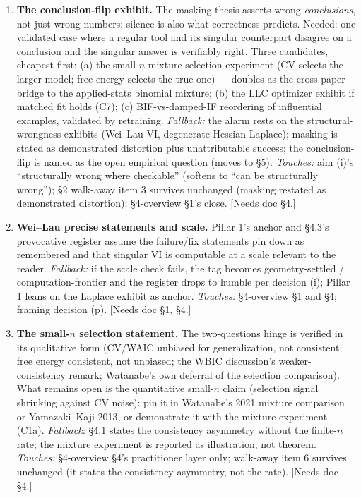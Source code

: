 \documentclass[11pt]{article}
\begin{document}
\begin{enumerate}[label=\textbf{C\arabic*.}, leftmargin=*, itemsep=6pt]

\item \textbf{The conclusion-flip exhibit.} The masking thesis asserts
wrong \emph{conclusions}, not just wrong numbers; silence is also what
correctness predicts. Needed: one validated case where a regular tool
and its singular counterpart disagree on a conclusion and the singular
answer is verifiably right. Three candidates, cheapest first: (a) the
small-$n$ mixture selection experiment (CV selects the larger model;
free energy selects the true one) --- doubles as the cross-paper bridge
to the applied-stats binomial mixture; (b) the LLC optimizer exhibit if
matched fit holds (C7); (c) BIF-vs-damped-IF reordering of influential
examples, validated by retraining. \emph{Fallback:} the alarm rests on
the structural-wrongness exhibits (Wei--Lau VI, degenerate-Hessian
Laplace); masking is stated as demonstrated distortion plus
unattributable success; the conclusion-flip is named as the open
empirical question (moves to \S5). \emph{Touches:} aim (i)'s
``structurally wrong where checkable'' (softens to ``can be
structurally wrong''); \S2 walk-away item 3 survives unchanged (masking
restated as demonstrated distortion); \S4-overview \S1's close. [Needs
doc \S4.]

\item \textbf{Wei--Lau precise statements and scale.} Pillar 1's anchor
and \S4.3's provocative register assume the failure/fix statements pin
down as remembered and that singular VI is computable at a scale
relevant to the reader. \emph{Fallback:} if the scale check fails, the
tag becomes geometry-settled / computation-frontier and the register
drops to humble per decision (i); Pillar 1 leans on the Laplace exhibit
as anchor. \emph{Touches:} \S4-overview \S1 and \S4; framing decision
(p). [Needs doc \S1, \S4.]

\item \textbf{The small-$n$ selection statement.} The two-questions
hinge is verified in its qualitative form (CV/WAIC unbiased for
generalization, not consistent; free energy consistent, not unbiased;
the WBIC discussion's weaker-consistency remark; Watanabe's own deferral
of the selection comparison). What remains open is the quantitative
small-$n$ claim (selection signal shrinking against CV noise): pin it in
Watanabe's 2021 mixture comparison or Yamazaki--Kaji 2013, or
demonstrate it with the mixture experiment (C1a). \emph{Fallback:} \S4.1
states the consistency asymmetry without the finite-$n$ rate; the
mixture experiment is reported as illustration, not theorem.
\emph{Touches:} \S4-overview \S4's practitioner layer only; walk-away
item 6 survives unchanged (it states the consistency asymmetry, not the
rate). [Needs doc \S4.]


\end{enumerate}
\end{document}
